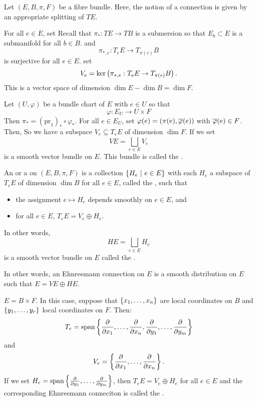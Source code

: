 \documentclass[main.tex]{subfiles}
\begin{document}
Let $(E, B, \pi, F)$ be a fibre bundle. Here, the notion of a connection is given by an appropriate splitting of $TE$.

For all $e \in E$, set
Recall that $\pi_* : TE \to TB$ is a submersion so that $E_b \subset E$ is a submanifold for all $b \in B$. and
\[
\pi_{*, e} : T_e E \to T_{\pi(e)}B
\]
is surjective for all $e \in E$. set
\[
V_e = \ker\left(  \pi_{*, e}: T_e E \to T_{\pi(e)}B \right).
\]This is a vector space of dimension $\dim E - \dim B = \dim F$.

Let $(U, \varphi)$ be a bundle chart of $E$ with $e \in U$ so that
\[
  \varphi: E_U \to U \times F
\]
Then $\pi_* = (\text{pr}_1)_* \circ \varphi_*.$ For all $e \in E_U$, set $\varphi(e) = (\pi(e), \overline{\varphi}(e))$ with $\overline{\varphi}(e) \in F$. Then,
So we have a subspace $V_e \subseteq T_e E$ of dimension $\dim F$. If we set
\[
VE = \bigsqcup_{e \in E} V_e
\]
is a smooth vector bundle on $E$. This bundle is called the .

\begin{defn}
  An  or a  on $(E, B, \pi, F)$ is a collection $\left\{H_e \ | \  e \in E\right\}$ with each $H_e$ a subspace of $T_e E$ of dimension $\dim B$ for all $e \in E$, called the , such that
  \begin{itemize}
    \item the assignment $e \mapsto H_e$ depends smoothly on $e \in E$, and
    \item for all $e \in E$, $T_eE = V_e \oplus H_e$.
  \end{itemize}
\end{defn}

\begin{note}
  In other words,
  \[
  HE = \bigsqcup_{e \in E} H_e
  \] is a smooth vector bundle on $E$ called the .
\end{note}

In other words, an Ehnresmann connection on $E$ is a smooth distribution on $E$ such that $E = VE \oplus HE$.

\begin{exmp}
  $E = B \times F$. In this case, suppose that $\left\{ x_1, \dots, x_n \right\}$ are local coordinates on $B$ and $\left\{ y_1, \dots, y_r\right\}$ local coordinates on $F$. Then:
  \[
  T_e = \text{span}\left\{\frac{ \partial  }{ \partial x_1 }, \dots, \frac{ \partial  }{ \partial x_n }, \frac{ \partial  }{ \partial y_1 }, \dots, \frac{ \partial  }{ \partial y_m }\right\}
  \]
and
  \[
  V_e = \left\{ \frac{ \partial  }{ \partial x_1 },\dots, \frac{ \partial  }{ \partial x_n }\right\}.
  \]
  If we set $H_e = \text{span}\left\{\frac{ \partial  }{ \partial y_1 }, \dots, \frac{ \partial  }{ \partial y_m }\right\}$, then $T_e E = V_e \oplus H_e$ for all $e \in E$ and the corresponding Ehnresmann conneciton is called the .

\end{exmp}
\end{document}
